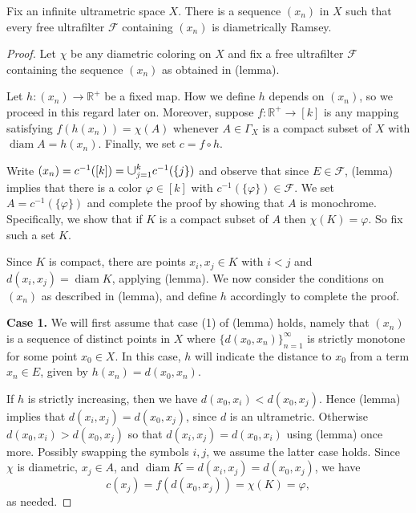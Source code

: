 \begin{theorem}
Fix an infinite ultrametric space \( X \). There is a sequence \( (x_{n}) \) in \( X \) such that every free ultrafilter \( \mathcal{F}  \) containing \( (x_{n}) \) is diametrically Ramsey.
\end{theorem}
\begin{proof}
Let \( \chi \) be any diametric coloring on \( X \) and fix a free ultrafilter \( \mathcal{F}  \) containing the sequence \( (x_{n} ) \) as obtained in (lemma).

Let \( h  : (x_{n}) \to \mathbb{R^{+}} \) be a fixed map. How we define \( h \) depends on \( (x_{n}) \), so we proceed in this regard later on. Moreover, suppose \( f : \mathbb{R}^{+} \to [k] \) is any mapping satisfying \( f(h(x_{n})) = \chi (A) \) whenever \( A \in \Gamma_{X} \) is a compact subset of \( X \) with \( \operatorname{diam}A = h(x_{n}) \). Finally, we set \( c = f \circ h  \).

Write \( (x_{n}) = c ^{-1} ([k]) = \medcup_{j=1}^{k} c^{-1} (\{ j \} )  \) and observe that since \( E \in \mathcal{F}  \), (lemma) implies that there is a color \( \varphi \in [k] \) with \( c ^{-1} (\{ \varphi  \} ) \in \mathcal{F}   \). We set \( A = c ^{-1} (\{ \varphi  \} )  \) and complete the proof by showing that \( A \) is monochrome. Specifically, we show that if \( K \) is a compact subset of \( A \) then \( \chi (K) = \varphi  \). So fix such a set \( K \).

Since \( K \) is compact, there are points \( x_{i} , x_{j} \in K \) with \( i < j \) and \( d(x_{i} , x_{j}) = \operatorname{diam} K \), applying (lemma). We now consider the conditions on \( (x_{n}) \) as described in (lemma), and define \( h \) accordingly to complete the proof.

\textbf{Case 1.} We will first assume that case (1) of (lemma) holds, namely that \( (x_{n}) \) is a sequence of distinct points in \( X \) where \( \{ d(x_0, x_{n} )  \}_{n = 1} ^{\infty} \) is strictly monotone for some point \( x_0 \in X \). In this case, \( h \) will indicate the distance to \( x_0 \) from a term \( x_{n} \in E \), given by \( h (x_{n}) = d(x_0, x_{n} ) \).

If \( h  \) is strictly increasing, then we have \( d(x_0, x_{i} ) < d(x_0, x_{j} ) \). Hence (lemma) implies that \( d(x_{i} , x_{j} ) = d(x_{0} , x_{j} ) \), since \( d \) is an ultrametric. Otherwise \( d(x_0, x_{i} ) > d(x_0, x_{j} ) \) so that \( d(x_{i} , x_{j} ) = d(x_0, x_{i} ) \) using (lemma) once more. Possibly swapping the symbols \( i,j \), we assume the latter case holds. Since \( \chi \) is diametric, \( x_{j} \in A \), and \( \operatorname{diam} K = d(x_{i} , x_{j} ) = d(x_0, x_{j} )  \), we have \[c(x_{j} ) = f(d(x_0, x_{j} )) = \chi (K) = \varphi , \] as needed.


\end{proof}
